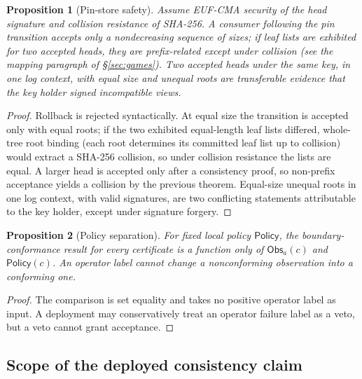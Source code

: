 \documentclass[11pt]{article}
\newtheorem{proposition}{Proposition}
\theoremstyle{remark}
\newcommand{\Obs}{\mathsf{Obs}}
\newcommand{\Policy}{\mathsf{Policy}}
\begin{document}
\begin{proposition}[Pin-store safety]
Assume EUF-CMA security of the head signature and collision resistance of
SHA-256. A consumer following the pin transition accepts only a nondecreasing
sequence of sizes; if leaf lists are exhibited for two accepted heads,
they are prefix-related except under collision (see the mapping paragraph
of \S\ref{sec:games}). Two accepted
heads under the same key, in one log context, with equal size and unequal
roots are transferable evidence that the key holder signed incompatible
views.
\end{proposition}
\begin{proof}
Rollback is rejected syntactically. At equal size the transition is accepted
only with equal roots; if the two exhibited equal-length leaf lists differed,
whole-tree root binding (each root determines its committed leaf list up
to collision) would extract a SHA-256 collision, so under collision
resistance the lists are equal. A larger head is accepted only after a
consistency proof, so non-prefix acceptance yields a collision by the previous
theorem. Equal-size unequal roots in one log context, with valid signatures, are two
conflicting statements attributable to the key holder, except under signature
forgery.
\end{proof}

\begin{proposition}[Policy separation]
For fixed local policy $\Policy$, the boundary-conformance result for every
certificate is a function only of $\Obs_a(c)$ and $\Policy(c)$. An operator
label cannot change a nonconforming observation into a conforming one.
\end{proposition}
\begin{proof}
The comparison is set equality and takes no positive operator label as input.
A deployment may conservatively treat an operator failure label as a veto, but
a veto cannot grant acceptance.
\end{proof}

\subsection{Scope of the deployed consistency claim}\label{sec:seamscope}
\end{document}
